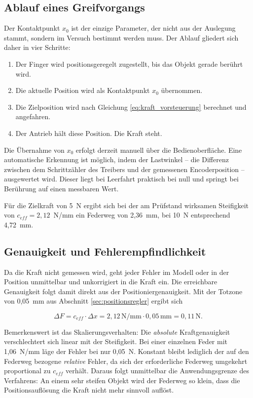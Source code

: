 \subsection*{Ablauf eines Greifvorgangs}

Der Kontaktpunkt $x_0$ ist der einzige Parameter, der nicht aus der Auslegung stammt,
sondern im Versuch bestimmt werden muss. Der Ablauf gliedert sich daher in vier Schritte:

\begin{enumerate}
    \item Der Finger wird positionsgeregelt zugestellt, bis das Objekt gerade berührt wird.
    \item Die aktuelle Position wird als Kontaktpunkt $x_0$ übernommen.
    \item Die Zielposition wird nach Gleichung \ref{eq:kraft_vorsteuerung} berechnet und
          angefahren.
    \item Der Antrieb hält diese Position. Die Kraft steht.
\end{enumerate}

Die Übernahme von $x_0$ erfolgt derzeit manuell über die Bedienoberfläche. Eine
automatische Erkennung ist möglich, indem der Lastwinkel -- die Differenz zwischen dem
Schrittzähler des Treibers und der gemessenen Encoderposition -- ausgewertet wird. Dieser
liegt bei Leerfahrt praktisch bei null und springt bei Berührung auf einen messbaren Wert.

Für die Zielkraft von 5~N ergibt sich bei der am Prüfstand wirksamen Steifigkeit von
$c_{eff} = 2{,}12$~N/mm ein Federweg von 2,36~mm, bei 10~N entsprechend 4,72~mm.

\subsection*{Genauigkeit und Fehlerempfindlichkeit}

Da die Kraft nicht gemessen wird, geht jeder Fehler im Modell oder in der Position
unmittelbar und unkorrigiert in die Kraft ein. Die erreichbare Genauigkeit folgt damit
direkt aus der Positioniergenauigkeit. Mit der Totzone von 0,05~mm aus Abschnitt
\ref{sec:positionsregler} ergibt sich

\begin{equation}
    \Delta F = c_{eff} \cdot \Delta x = 2{,}12\,\mathrm{N/mm} \cdot 0{,}05\,\mathrm{mm}
    = 0{,}11\,\mathrm{N} .
    \label{eq:kraftfehler}
\end{equation}

Bemerkenswert ist das Skalierungsverhalten: Die \emph{absolute} Kraftgenauigkeit
verschlechtert sich linear mit der Steifigkeit. Bei einer einzelnen Feder mit 1,06~N/mm
läge der Fehler bei nur 0,05~N. Konstant bleibt lediglich der auf den Federweg bezogene
\emph{relative} Fehler, da sich der erforderliche Federweg umgekehrt proportional zu
$c_{eff}$ verhält. Daraus folgt unmittelbar die Anwendungsgrenze des Verfahrens: An einem
sehr steifen Objekt wird der Federweg so klein, dass die Positionsauflösung die Kraft
nicht mehr sinnvoll auflöst.

